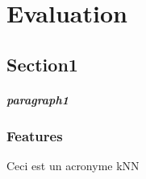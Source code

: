 \chapter{Evaluation}

\section{Section1}
\paragraph{paragraph1}
\subsection{Features}

Ceci est un acronyme \acl{kNN}